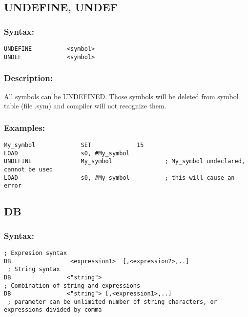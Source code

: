     \subsection{UNDEFINE, UNDEF}

        \subsubsection{Syntax:}
        {
            \usecodefont
            \verb'UNDEFINE          <symbol>'\\
            \verb'UNDEF             <symbol>'
        }

        \subsubsection{Description:}
            All symbols can be UNDEFINED. Those symbols will be deleted from symbol table (file .sym) and compiler will not recognize them.

        \subsubsection{Examples:}
        {
            \usecodefont
            \verb'My_symbol             SET             15'\\
            \verb'LOAD                  s0, #My_symbol'\\
            \verb'UNDEFINE              My_symbol               ; My_symbol undeclared, cannot be used'\\
            \verb'LOAD                  s0, #My_symbol          ; this will cause an error'\\
        }

    \subsection{DB}
        \subsubsection{Syntax:}
        {
            \usecodefont
            \verb '; Expresion syntax'\\
            \verb'DB                 <expression1>  [,<expression2>,..]'\\
            \verb' ; String syntax'\\
            \verb'DB                <"string">'\\
            \verb'; Combination of string and expressions'\\
            \verb'DB                <"string"> [,<expression1>,..]'\\
            \verb' ; parameter can be unlimited number of string characters, or expressions divided by comma'\\
        }
